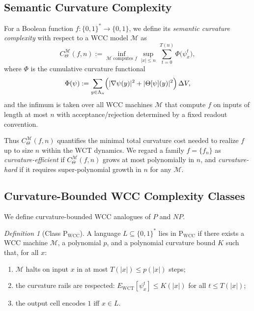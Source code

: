\documentclass[12pt]{article}
\theoremstyle{remark}
\newtheorem{definition}[theorem]{Definition}
\begin{document}
\subsection{Semantic Curvature Complexity}

For a Boolean function $f:\{0,1\}^* \to \{0,1\}$, we define its
\emph{semantic curvature complexity} with respect to a WCC model
$\mathcal{M}$ as
\begin{equation}
    C_\Theta^{\mathcal{M}}(f,n)
    := \inf_{\mathcal{M}\text{ computes } f}
          \sup_{|x|\le n}\,
          \sum_{t=0}^{T(n)}
          \Phi\bigl(\psi^t_x\bigr),
\end{equation}
where $\Phi$ is the cumulative curvature functional
\begin{equation}
    \Phi(\psi)
    := \sum_{y\in\Lambda_n}
       \Bigl(
         |\nabla\psi(y)|^2 + |\Theta[\psi](y)|^2
       \Bigr)\,\Delta V,
\end{equation}
and the infimum is taken over all WCC machines $\mathcal{M}$ that
compute $f$ on inputs of length at most $n$ with acceptance/rejection
determined by a fixed readout convention.

Thus $C_\Theta^{\mathcal{M}}(f,n)$ quantifies the minimal total
curvature cost needed to realize $f$ up to size $n$ within the WCT
dynamics. We regard a family $f=\{f_n\}$ as \emph{curvature-efficient}
if $C_\Theta^{\mathcal{M}}(f,n)$ grows at most polynomially in $n$,
and \emph{curvature-hard} if it requires super-polynomial growth in
$n$ for any $\mathcal{M}$.

\subsection{Curvature-Bounded WCC Complexity Classes}

We define curvature-bounded WCC analogues of $P$ and $NP$.

\begin{definition}[Class $\mathrm{P}_{\mathrm{WCC}}$]
A language $L\subseteq\{0,1\}^*$ lies in $\mathrm{P}_{\mathrm{WCC}}$
if there exists a WCC machine $\mathcal{M}$, a polynomial $p$, and a
polynomial curvature bound $K$ such that, for all $x$:
\begin{enumerate}
    \item $\mathcal{M}$ halts on input $x$ in at most $T(|x|)\le p(|x|)$
          steps;
    \item the curvature rails are respected:
          $E_{\text{WCT}}[\psi^t_x]\le K(|x|)$ for all $t\le T(|x|)$;
    \item the output cell encodes $1$ iff $x\in L$.
\end{enumerate}
\end{definition}
\end{document}
